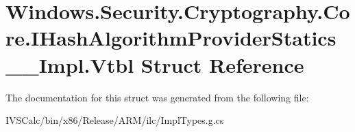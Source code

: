 \hypertarget{struct_windows_1_1_security_1_1_cryptography_1_1_core_1_1_i_hash_algorithm_provider_statics_____impl_1_1_vtbl}{}\section{Windows.\+Security.\+Cryptography.\+Core.\+I\+Hash\+Algorithm\+Provider\+Statics\+\_\+\+\_\+\+Impl.\+Vtbl Struct Reference}
\label{struct_windows_1_1_security_1_1_cryptography_1_1_core_1_1_i_hash_algorithm_provider_statics_____impl_1_1_vtbl}


The documentation for this struct was generated from the following file\+:\begin{DoxyCompactItemize}
\item 
I\+V\+S\+Calc/bin/x86/\+Release/\+A\+R\+M/ilc/Impl\+Types.\+g.\+cs\end{DoxyCompactItemize}
